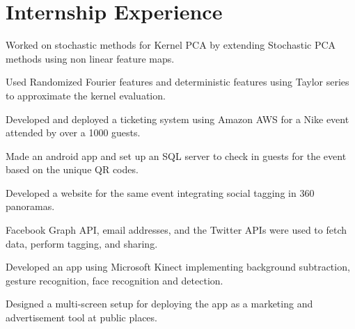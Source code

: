 \documentclass[US paper]{deedy-resume} %
\begin{document}
\section{Internship Experience}
\vspace{-4pt}

{
\begin{tightitemize}
\item Worked on stochastic methods for Kernel PCA by extending Stochastic PCA methods using non linear feature maps.
\item Used Randomized Fourier features and deterministic features using Taylor series to approximate the kernel evaluation.
\end{tightitemize}

\vspace{1mm}

\begin{tightitemize}
\item Developed and deployed a ticketing system using Amazon AWS for a Nike event attended by over a 1000 guests.
\item Made an android app and set up an SQL server to check in guests for the event based on the unique QR codes.
\item Developed a website for the same event integrating social tagging in 360 panoramas.
\item Facebook Graph API, email addresses, and the Twitter APIs were used to fetch data, perform tagging, and sharing.

\end{tightitemize}

\vspace{1mm}




\begin{tightitemize}
\item Developed an app using Microsoft Kinect implementing background subtraction, gesture recognition, face recognition and detection.
\item Designed a multi-screen setup for deploying the app as a marketing and advertisement tool at public places.
\end{tightitemize}


}
\end{document}
